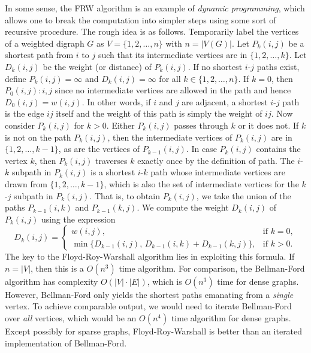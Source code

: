 In some sense, the FRW algorithm is an example of
\emph{dynamic programming}, which allows one to break the computation
into simpler steps using some sort of recursive procedure. The rough
idea is as follows. Temporarily label the vertices of a weighted
digraph $G$ as $V = \{1,2,\dots,n\}$ with $n = |V(G)|$. Let $P_k(i,j)$
be a shortest path from $i$ to $j$ such that its intermediate vertices
are in $\{1, 2, \dots, k\}$. Let $D_k(i,j)$ be the weight (or
distance) of $P_k(i,j)$. If no shortest $i$-$j$ paths exist, define
$P_k(i,j) = \infty$ and $D_k(i,j) = \infty$ for all
$k \in \{1, 2, \dots, n\}$. If $k = 0$, then $P_0(i,j): i, j$ since no
intermediate vertices are allowed in the path and hence
$D_0(i,j) = w(i,j)$. In other words, if $i$ and $j$ are adjacent, a
shortest $i$-$j$ path is the edge $ij$ itself and the weight of this
path is simply the weight of $ij$. Now consider $P_k(i,j)$ for
$k > 0$. Either $P_k(i,j)$ passes through $k$ or it does not. If $k$
is not on the path $P_k(i,j)$, then the intermediate vertices of
$P_k(i,j)$ are in  $\{1, 2, \dots, k-1\}$, as are the vertices of
$P_{k-1}(i,j)$. In case $P_k(i,j)$ contains the vertex $k$, then
$P_k(i,j)$ traverses $k$ exactly once by the definition of path. The
$i$-$k$ subpath in $P_k(i,j)$ is a shortest $i$-$k$ path whose
intermediate vertices are drawn from $\{1, 2, \dots, k-1\}$, which is
also the set of intermediate vertices for the $k$-$j$ subpath in
$P_k(i,j)$. That is, to obtain $P_k(i,j)$, we take the union of the
paths $P_{k-1}(i,k)$ and $P_{k-1}(k,j)$. We compute the weight
$D_k(i,j)$ of $P_k(i,j)$ using the expression
\[
D_k(i,j)
=
\begin{cases}
w(i,j), & \text{if $k = 0$}, \\
\min\{D_{k-1}(i,j),\, D_{k-1}(i,k) + D_{k-1}(k,j)\}, & \text{if $k > 0$}.
\end{cases}
\]
The key to the Floyd-Roy-Warshall algorithm lies in exploiting this
formula. If $n = |V|$, then this is a $O(n^3)$ time algorithm. For
comparison, the Bellman-Ford algorithm has complexity
$O(|V| \cdot |E|)$, which is $O(n^3)$ time for dense graphs. However,
Bellman-Ford only yields the shortest paths emanating from a
\emph{single} vertex. To achieve comparable output, we would need to
iterate Bellman-Ford over \emph{all} vertices, which would be
an  $O(n^4)$ time algorithm for dense graphs. Except possibly for
sparse graphs, Floyd-Roy-Warshall is better than an iterated
implementation of Bellman-Ford.

